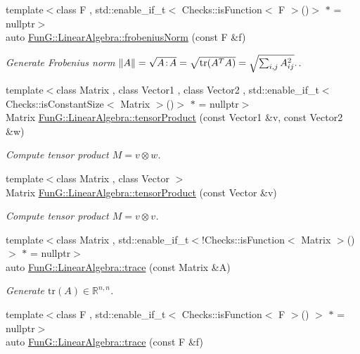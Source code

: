 \begin{DoxyCompactItemize}
{\footnotesize template$<$class F , std\-::enable\-\_\-if\-\_\-t$<$ Checks\-::is\-Function$<$ F $>$()$>$ $\ast$  = nullptr$>$ }\\auto \hyperlink{group__LinearAlgebraGroup_gafa2f358f9310cecb787620ad8ec460a6}{\-Fun\-G\-::\-Linear\-Algebra\-::frobenius\-Norm} (const \-F \&f)
\begin{DoxyCompactList}\small\item\em \-Generate \-Frobenius norm $ \|A\| = \sqrt{A\negthinspace : \negthinspace A }= \sqrt{\mathrm{tr}(A^TA)} = \sqrt{\sum_{i,j} A_{ij}^2}. $. \end{DoxyCompactList}\item 
{\footnotesize template$<$class Matrix , class Vector1 , class Vector2 , std\-::enable\-\_\-if\-\_\-t$<$ Checks\-::is\-Constant\-Size$<$ Matrix $>$()$>$ $\ast$  = nullptr$>$ }\\\-Matrix \hyperlink{group__LinearAlgebraGroup_ga5d0e066e6184fb3324d96d20087b5578}{\-Fun\-G\-::\-Linear\-Algebra\-::tensor\-Product} (const \-Vector1 \&v, const \-Vector2 \&w)
\begin{DoxyCompactList}\small\item\em \-Compute tensor product $ M = v \otimes w $. \end{DoxyCompactList}\item 
{\footnotesize template$<$class Matrix , class Vector $>$ }\\\-Matrix \hyperlink{group__LinearAlgebraGroup_gae5e82b9e66319511dae5ff0d9304a6b7}{\-Fun\-G\-::\-Linear\-Algebra\-::tensor\-Product} (const \-Vector \&v)
\begin{DoxyCompactList}\small\item\em \-Compute tensor product $ M = v \otimes v $. \end{DoxyCompactList}\item 
{\footnotesize template$<$class Matrix , std\-::enable\-\_\-if\-\_\-t$<$!\-Checks\-::is\-Function$<$ Matrix $>$()$>$ $\ast$  = nullptr$>$ }\\auto \hyperlink{group__LinearAlgebraGroup_ga4d73eb4d46dd9196a31e2d6d557d509e}{\-Fun\-G\-::\-Linear\-Algebra\-::trace} (const \-Matrix \&\-A)
\begin{DoxyCompactList}\small\item\em \-Generate $\mathrm{tr}(A)\in\mathbb{R}^{n,n}$. \end{DoxyCompactList}\item 
{\footnotesize template$<$class F , std\-::enable\-\_\-if\-\_\-t$<$ Checks\-::is\-Function$<$ F $>$() $>$ $\ast$  = nullptr$>$ }\\auto \hyperlink{group__LinearAlgebraGroup_ga950717870525c43be79245413717673c}{\-Fun\-G\-::\-Linear\-Algebra\-::trace} (const \-F \&f)

\end{DoxyCompactItemize}
